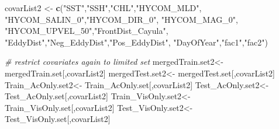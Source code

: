\documentclass[11pt,]{article}
\newenvironment{Shaded}{\begin{snugshade}}{\end{snugshade}}
\newcommand{\KeywordTok}[1]{\textcolor[rgb]{0.13,0.29,0.53}{\textbf{{#1}}}}
\newcommand{\StringTok}[1]{\textcolor[rgb]{0.31,0.60,0.02}{{#1}}}
\newcommand{\CommentTok}[1]{\textcolor[rgb]{0.56,0.35,0.01}{\textit{{#1}}}}
\newcommand{\NormalTok}[1]{{#1}}
\begin{document}
\begin{Shaded}
\begin{Highlighting}[]
\NormalTok{covarList2 <-}\StringTok{ }\KeywordTok{c}\NormalTok{(}\StringTok{"SST"}\NormalTok{,}\StringTok{"SSH"}\NormalTok{,}\StringTok{"CHL"}\NormalTok{,}\StringTok{"HYCOM_MLD"}\NormalTok{,}
                \StringTok{"HYCOM_SALIN_0"}\NormalTok{,}\StringTok{"HYCOM_DIR_0"}\NormalTok{,}
                \StringTok{"HYCOM_MAG_0"}\NormalTok{,}
                \StringTok{"HYCOM_UPVEL_50"}\NormalTok{,}\StringTok{"FrontDist_Cayula"}\NormalTok{,}
                \StringTok{"EddyDist"}\NormalTok{,}\StringTok{"Neg_EddyDist"}\NormalTok{,}\StringTok{"Pos_EddyDist"}\NormalTok{,}
                \StringTok{"DayOfYear"}\NormalTok{,}\StringTok{"fac1"}\NormalTok{,}\StringTok{"fac2"}\NormalTok{)}

\CommentTok{# restrict covariates again to limited set}
\NormalTok{mergedTrain.set2<-}\StringTok{ }\NormalTok{mergedTrain.set[,covarList2]}
\NormalTok{mergedTest.set2<-}\StringTok{ }\NormalTok{mergedTest.set[,covarList2]}
\NormalTok{Train_AcOnly.set2<-}\StringTok{ }\NormalTok{Train_AcOnly.set[,covarList2]}
\NormalTok{Test_AcOnly.set2<-}\StringTok{ }\NormalTok{Test_AcOnly.set[,covarList2]}
\NormalTok{Train_VisOnly.set2<-}\StringTok{ }\NormalTok{Train_VisOnly.set[,covarList2]}
\NormalTok{Test_VisOnly.set2<-}\StringTok{ }\NormalTok{Test_VisOnly.set[,covarList2]}


\end{Highlighting}
\end{Shaded}
\end{document}

